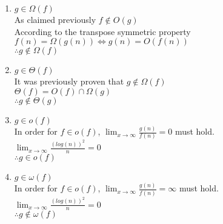 \documentclass[11pt]{article}
\begin{document}
\begin{enumerate}
			\item $g \in \Omega(f)$ \\
				As claimed previously $ f \notin O(g)$ \\ 
				According to the transpose symmetric property $f(n) = \Omega (g(n)) \Leftrightarrow g(n) = O(f(n)) $ \\
				$\therefore g \notin \Omega (f)$
			
			\item $g \in \Theta(f)$ \\
				It was previously proven that $g \notin \Omega(f)$ \\
				$\Theta(f) = O(f) \cap \Omega(g)$\\
				$\therefore g \notin \Theta (g)$
				
			\item $g \in o(f)$ \\
				In order for $f \in o(f)$, $\lim_{x \to \infty} \frac{g(n)}{f(n)} = 0$	must hold. \\
				$\lim_{x \to \infty} \frac{(log(n))^{2}}{n} = 0 $\\
				$\therefore g \in o(f)$
				
			\item $g \in \omega(f)$ \\
				In order for $f \in o(f)$, $\lim_{x \to \infty} \frac{g(n)}{f(n)} = \infty$	must hold. \\
				$\lim_{x \to \infty} \frac{(log(n))^{2}}{n} = 0 $\\
				$\therefore g \notin \omega(f)$
		\end{enumerate}
		
\end{document}
